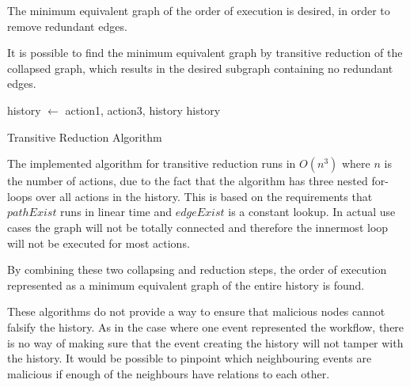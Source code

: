 	The minimum equivalent graph of the order of execution is desired, in order to remove redundant edges. 
	
	It is possible to find the minimum equivalent graph by transitive reduction of the collapsed graph, which results in the desired subgraph containing no redundant edges.
	
	\begin{algorithm}
		\begin{algorithmic}
										\State history $\leftarrow$  {action1, action3, history}
									\EndIf
								\EndIf
							\EndFor
						\EndIf
					\EndFor
				\EndFor
			\State
			\Return history
			\EndFunction
		\end{algorithmic}
		\caption{Transitive Reduction Algorithm}
	\end{algorithm}
	
	\newpar The implemented algorithm for transitive reduction runs in $O(n^3)$ where $n$ is the number of actions, due to the fact that the algorithm has three nested for-loops over all actions in the history. This is based on the requirements that $pathExist$ runs in linear time and $edgeExist$ is a constant lookup. In actual use cases the graph will not be totally connected and therefore the innermost loop will not be executed for most actions.
	
	\newpar By combining these two collapsing and reduction steps, the order of execution represented as a minimum equivalent graph of the entire history is found. 
	
	\newpar These algorithms do not provide a way to ensure that malicious nodes cannot falsify the history. As in the case where one event represented the workflow, there is no way of making sure that the event creating the history will not tamper with the history. It would be possible to pinpoint which neighbouring events are malicious if enough of the neighbours have relations to each other. 
